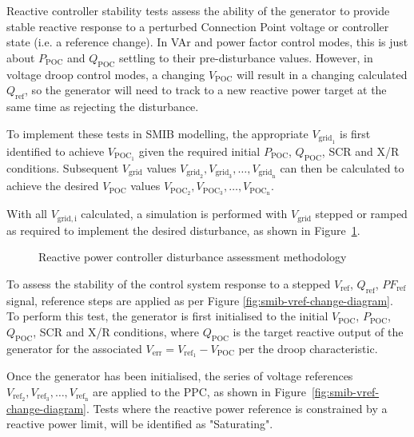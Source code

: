 Reactive controller stability tests assess the ability of the generator to provide stable reactive response to a perturbed Connection Point voltage or controller state (i.e. a reference change). In VAr and power factor control modes, this is just about  $P_{\mathrm{POC}}$ and $Q_{\mathrm{POC}}$ settling to their pre-disturbance values. However, in voltage droop control modes, a changing $V_{\mathrm{POC}}$ will result in a changing calculated $Q_{\mathrm{ref}}$, so the generator will need to track to a new reactive power target at the same time as rejecting the disturbance.

To implement these tests in \ac{SMIB} modelling, the appropriate $V_{\mathrm{grid}_{\mathrm{1}}}$
is first identified to achieve $V_{\mathrm{POC}_{\mathrm{1}}}$ given the required initial $P_{\mathrm{POC}}$, $Q_{\mathrm{POC}}$, SCR and X/R conditions. Subsequent $V_{\mathrm{grid}}$ values $V_{\mathrm{grid}_{\mathrm{2}}}, V_{\mathrm{grid}_{\mathrm{3}}}, \dots, V_{\mathrm{grid}_{\mathrm{n}}}$ can then be calculated to achieve the desired $V_{\mathrm{POC}}$ values $V_{\mathrm{POC}_{\mathrm{2}}}, V_{\mathrm{POC}_{\mathrm{3}}}, \dots, V_{\mathrm{POC}_{\mathrm{n}}}$.

With all $V_{\mathrm{grid,i}}$ calculated, a simulation is performed with $V_{\mathrm{grid}}$ stepped or ramped as required to implement the desired disturbance, as shown in Figure~\ref{fig:smib-vgrid-disturbance-diagram}.

\begin{figure}[H]
	\centering
	
	\caption{Reactive power controller disturbance assessment methodology}
	\label{fig:smib-vgrid-disturbance-diagram}
\end{figure}

To assess the stability of the control system response to a stepped $V_{\mathrm{ref}}$, $Q_{\mathrm{ref}}$, $PF_{\mathrm{ref}}$ signal, reference steps are applied as per Figure \ref{fig:smib-vref-change-diagram}. To perform this test, the generator is first initialised to the initial $V_{\mathrm{POC}}$, $P_{\mathrm{POC}}$, $Q_{\mathrm{POC}}$, SCR and X/R conditions, where $Q_{\mathrm{POC}}$ is the target reactive output of the generator for the associated $V_{\mathrm{err}} = V_{\mathrm{ref}_{\mathrm{1}}} - V_{\mathrm{POC}}$ per the droop characteristic.

Once the generator has been initialised, the series of voltage references $V_{\mathrm{ref}_{\mathrm{2}}}, V_{\mathrm{ref}_{\mathrm{3}}}, \dots, V_{\mathrm{ref}_{\mathrm{n}}}$ are applied to the PPC, as shown in Figure~\ref{fig:smib-vref-change-diagram}. Tests where the reactive power reference is constrained by a reactive power limit, will be identified as "Saturating".

